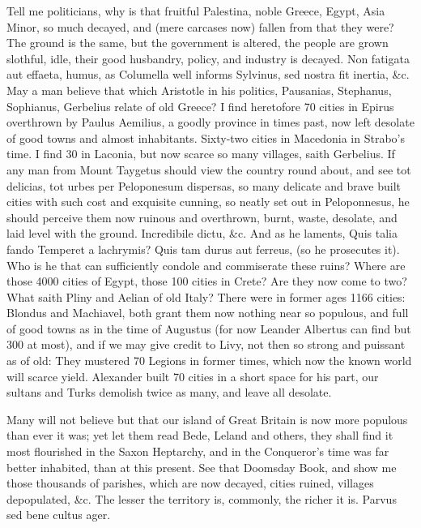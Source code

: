 {Tell me politicians, why is that fruitful Palestina, noble Greece,
Egypt, Asia Minor, so much decayed, and (mere carcases now) fallen from
that they were? The ground is the same, but the government is altered,
the people are grown slothful, idle, their good husbandry, policy, and
industry is decayed. Non fatigata aut effaeta, humus, as Columella
well informs Sylvinus, sed nostra fit inertia, \&c. May a man believe
that which Aristotle in his politics, Pausanias, Stephanus, Sophianus,
Gerbelius relate of old Greece? I find heretofore 70 cities in Epirus
overthrown by Paulus Aemilius, a goodly province in times past,
now left desolate of good towns and almost inhabitants. Sixty-two
cities in Macedonia in Strabo's time. I find 30 in Laconia, but now
scarce so many villages, saith Gerbelius. If any man from Mount
Taygetus should view the country round about, and see tot delicias, tot
urbes per Peloponesum dispersas, so many delicate and brave built
cities with such cost and exquisite cunning, so neatly set out in
Peloponnesus, he should perceive them now ruinous and overthrown,
burnt, waste, desolate, and laid level with the ground. Incredibile
dictu, \&c. And as he laments, Quis talia fando Temperet a lachrymis?
Quis tam durus aut ferreus, (so he prosecutes it). Who is he that
can sufficiently condole and commiserate these ruins? Where are those
4000 cities of Egypt, those 100 cities in Crete? Are they now come to
two? What saith Pliny and Aelian of old Italy? There were in former
ages 1166 cities: Blondus and Machiavel, both grant them now nothing
near so populous, and full of good towns as in the time of Augustus
(for now Leander Albertus can find but 300 at most), and if we may give
credit to Livy, not then so strong and puissant as of old: They
mustered 70 Legions in former times, which now the known world will
scarce yield. Alexander built 70 cities in a short space for his part,
our sultans and Turks demolish twice as many, and leave all desolate.

Many will not believe but that our island of Great Britain is now more
populous than ever it was; yet let them read Bede, Leland and others,
they shall find it most flourished in the Saxon Heptarchy, and in the
Conqueror's time was far better inhabited, than at this present. See
that Doomsday Book, and show me those thousands of parishes, which are
now decayed, cities ruined, villages depopulated, \&c. The lesser the
territory is, commonly, the richer it is. Parvus sed bene cultus ager.

}
